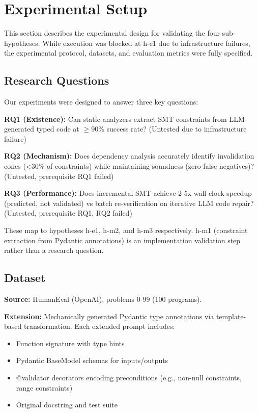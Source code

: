 \section{Experimental Setup}

This section describes the experimental design for validating the four sub-hypotheses. While execution was blocked at h-e1 due to infrastructure failures, the experimental protocol, datasets, and evaluation metrics were fully specified.

\subsection{Research Questions}

Our experiments were designed to answer three key questions:

\textbf{RQ1 (Existence):} Can static analyzers extract SMT constraints from LLM-generated typed code at $\geq$90\% success rate? (Untested due to infrastructure failure)

\textbf{RQ2 (Mechanism):} Does dependency analysis accurately identify invalidation cones (<30\% of constraints) while maintaining soundness (zero false negatives)? (Untested, prerequisite RQ1 failed)

\textbf{RQ3 (Performance):} Does incremental SMT achieve 2-5x wall-clock speedup (predicted, not validated) vs batch re-verification on iterative LLM code repair? (Untested, prerequisite RQ1, RQ2 failed)

These map to hypotheses h-e1, h-m2, and h-m3 respectively. h-m1 (constraint extraction from Pydantic annotations) is an implementation validation step rather than a research question.

\subsection{Dataset}

\textbf{Source:} HumanEval (OpenAI), problems 0-99 (100 programs).

\textbf{Extension:} Mechanically generated Pydantic type annotations via template-based transformation. Each extended prompt includes:
\begin{itemize}
\item Function signature with type hints
\item Pydantic BaseModel schemas for inputs/outputs
\item @validator decorators encoding preconditions (e.g., non-null constraints, range constraints)
\item Original docstring and test suite
\end{itemize}

